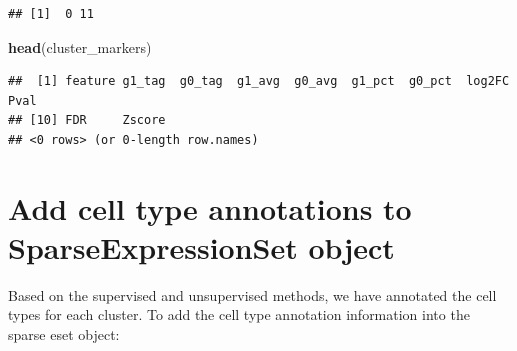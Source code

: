 \documentclass[
  12pt,
]{book}
\newenvironment{Shaded}{\begin{snugshade}}{\end{snugshade}}
\newcommand{\AttributeTok}[1]{\textcolor[rgb]{0.13,0.29,0.53}{#1}}
\newcommand{\FunctionTok}[1]{\textcolor[rgb]{0.13,0.29,0.53}{\textbf{#1}}}
\newcommand{\NormalTok}[1]{#1}
\newcommand{\OtherTok}[1]{\textcolor[rgb]{0.56,0.35,0.01}{#1}}
\newcommand{\SpecialCharTok}[1]{\textcolor[rgb]{0.81,0.36,0.00}{\textbf{#1}}}
\newcommand{\StringTok}[1]{\textcolor[rgb]{0.31,0.60,0.02}{#1}}
\begin{document}
\begin{verbatim}
## [1]  0 11
\end{verbatim}

\begin{Shaded}
\begin{Highlighting}[]
\FunctionTok{head}\NormalTok{(cluster\_markers)}
\end{Highlighting}
\end{Shaded}

\begin{verbatim}
##  [1] feature g1_tag  g0_tag  g1_avg  g0_avg  g1_pct  g0_pct  log2FC  Pval   
## [10] FDR     Zscore 
## <0 rows> (or 0-length row.names)
\end{verbatim}

\section{Add cell type annotations to SparseExpressionSet object}\label{add-cell-type-annotations-to-sparseexpressionset-object}

Based on the supervised and unsupervised methods, we have annotated the cell types for each cluster. To add the cell type annotation information into the sparse eset object:

\begin{Shaded}
\end{Shaded}
\end{document}
